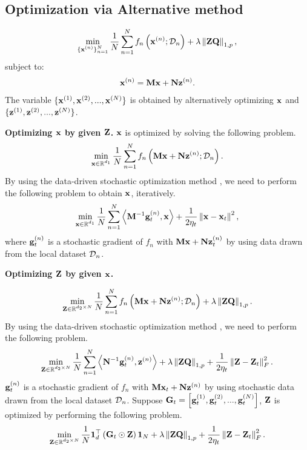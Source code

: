 \documentclass[journal]{IEEEtran}
\begin{document}
\subsection{Optimization via Alternative method}

\begin{align}
\min_{\substack{\{{\bf x}^{(n)}\}_{n=1}^N}} \frac{1}{N}\sum_{n=1}^N f_n\left( {\bf x}^{(n)}; \mathcal{D}_n \right) + \lambda \left\lVert{\bf Z}{\bf Q}\right\rVert_{1,p},
\end{align} subject to:
\begin{align}
{\bf x}^{(n)} = {\bf M}{\bf x} + {\bf N} {\bf z}^{(n)}.
\end{align}
The variable $\{{\bf x}^{(1)}, {\bf x}^{(2)}, ..., {\bf x}^{(N)}\}$ is obtained by alternatively optimizing ${\bf x}$ and $\{{\bf z}^{(1)}, {\bf z}^{(2)}, ..., {\bf z}^{(N)}\}$.

\textbf{Optimizing ${\bf x}$ by given ${\bf Z}$.} ${\bf x}$ is optimized by solving the following problem.
\begin{align}
\min_{\substack{{\bf x}\in\mathbb{R}^{d_1}}} \frac{1}{N}\sum_{n=1}^N f_n\left( {\bf M}{\bf x} + {\bf N} {\bf z}^{(n)}; \mathcal{D}_n \right).
\end{align} By using the data-driven stochastic optimization method \cite{dd}, we need to perform the following problem to obtain ${\bf x}$, iteratively.
\begin{align}
\nonumber
\min_{\substack{{\bf x}\in\mathbb{R}^{d_1}}} \frac{1}{N}\sum_{n=1}^N \left\langle{\bf M}^{-1}{\bf g}_t^{(n)}, {\bf x} \right\rangle + \frac{1}{2\eta_t}\left\lVert{\bf x} - {\bf x}_t\right\rVert^2,
\end{align} where ${\bf g}_t^{(n)}$ is a stochastic gradient of $f_n$ with ${\bf M}{\bf x} + {\bf N} {\bf z}_t^{(n)}$ by using data drawn from the local dataset $\mathcal{D}_n$.


\textbf{Optimizing ${\bf Z}$ by given ${\bf x}$.}

\begin{align}
\min_{\substack{{\bf Z}\in\mathbb{R}^{d_2\times N}}} \frac{1}{N}\sum_{n=1}^N f_n\left( {\bf M}{\bf x} + {\bf N} {\bf z}^{(n)}; \mathcal{D}_n \right) + \lambda \left\lVert{\bf Z}{\bf Q}\right\rVert_{1,p}.
\end{align}  By using the data-driven stochastic optimization method \cite{dd}, we need to perform the following problem.
\begin{align}
\nonumber
\min_{\substack{{\bf Z}\in\mathbb{R}^{d_2\times N}}} \frac{1}{N}\sum_{n=1}^N \left\langle{\bf N}^{-1} {\bf g}_t^{(n)}, {\bf z}^{(n)} \right\rangle + \lambda \left\lVert{\bf Z}{\bf Q}\right\rVert_{1,p} + \frac{1}{2\eta_t}\left\lVert{\bf Z} - {\bf Z}_t\right\rVert_F^2.
\end{align} ${\bf g}_t^{(n)}$ is a stochastic gradient of $f_n$ with ${\bf M}{\bf x}_t + {\bf N} {\bf z}^{(n)}$ by using stochastic data  drawn from the local dataset $\mathcal{D}_n$. Suppose ${\bf G}_t = \left [ {\bf g}_t^{(1)}, {\bf g}_t^{(2)}, ..., {\bf g}_t^{(N)} \right ]$, ${\bf Z}$ is optimized by performing the following problem.
\begin{align}
\nonumber
\min_{\substack{{\bf Z}\in\mathbb{R}^{d_2\times N}}} \frac{1}{N}{\bf 1}_d^\top\left( {\bf G}_t \odot {\bf Z} \right){\bf 1}_N + \lambda \left\lVert{\bf Z}{\bf Q}\right\rVert_{1,p} + \frac{1}{2\eta_t}\left\lVert{\bf Z} - {\bf Z}_t\right\rVert_F^2.
\end{align}
\end{document}
